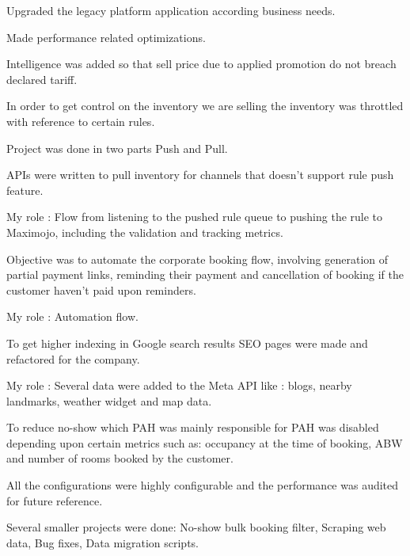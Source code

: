 \documentclass[]{deedy-resume-openfont}
\begin{document}
\begin{tightemize}
\item Upgraded the legacy platform application according business needs.
\item Made performance related optimizations.
\item Intelligence was added so that sell price due to applied promotion do not breach declared tariff.
\end{tightemize}

\begin{tightemize}
\item In order to get control on the inventory we are selling the inventory was throttled with reference to certain rules.
\item Project was done in two parts Push and Pull.
\item APIs were written to pull inventory for channels that doesn’t support rule push feature.
\item My role : Flow from listening to the pushed rule queue to pushing the rule to Maximojo, including the validation and tracking metrics.
\end{tightemize}
\begin{tightemize}
\item Objective was to automate the corporate booking flow, involving generation of partial payment links, reminding their payment and cancellation of booking if the customer haven’t paid upon reminders.
\item My role : Automation flow.
\end{tightemize}
\begin{tightemize}
\item To get higher indexing in Google search results SEO pages were made and refactored for the company.
\item My role : Several data were added to the Meta API like : blogs, nearby landmarks, weather widget and map data.
\end{tightemize}
\begin{tightemize}
\item To reduce no-show which PAH was mainly responsible for PAH was disabled depending upon certain metrics such as: occupancy at the time of booking, ABW and number of rooms booked by the customer.
\item All the configurations were highly configurable and the performance was audited for future reference.
\end{tightemize}
\begin{tightemize}
\item Several smaller projects were done: No-show bulk booking filter, Scraping web data, Bug fixes, Data migration scripts.
\end{tightemize}
\sectionsep
\end{document}
